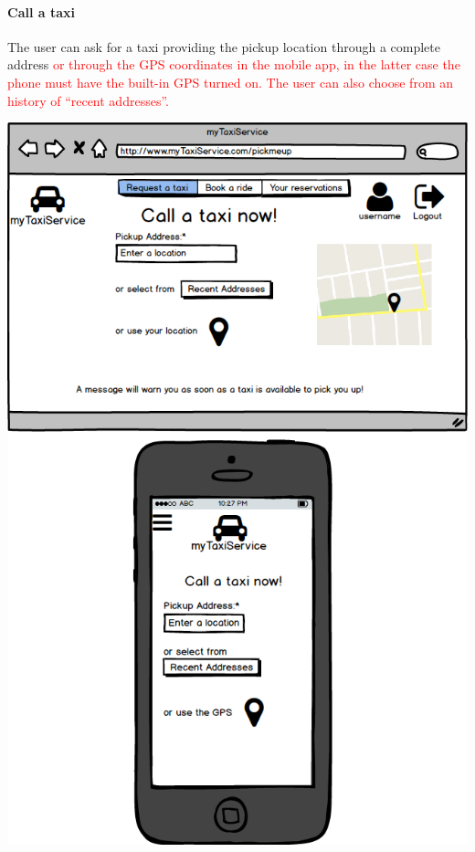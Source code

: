 \documentclass[a4paper,11pt]{report} %
\begin{document}
	\paragraph{Call a taxi} The user can ask for a taxi providing the pickup location through a complete address \textcolor{red}{or through the GPS coordinates in the mobile app, in the latter case the phone must have the built-in GPS turned on. The user can also choose from an history of ``recent addresses''.}
	\begin{center}
		\includegraphics[width=0.9\linewidth]{Pictures/CallATaxi}
	\end{center}
	\pagebreak
	
\end{document}
